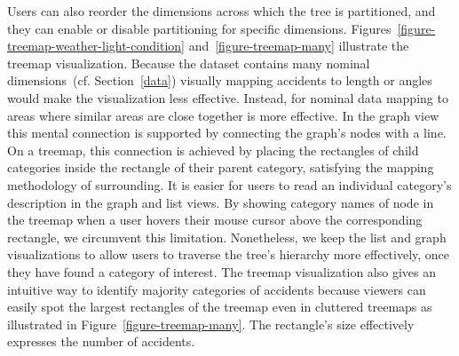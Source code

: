 Users can also reorder the dimensions across which the tree is partitioned, and they can enable or disable partitioning for specific dimensions.
Figures~\ref{figure-treemap-weather-light-condition} and~\ref{figure-treemap-many} illustrate the treemap visualization.
Because the dataset contains many nominal dimensions~(cf. Section~\ref{data}) visually mapping accidents to length or angles would make the visualization less effective. Instead, for nominal data mapping to areas where similar areas are close together is more effective.
In the graph view this mental connection is supported by connecting the graph's nodes with a line. On a treemap, this connection is achieved by placing the rectangles of child categories inside the rectangle of their parent category, satisfying the mapping methodology of surrounding.
It is easier for users to read an individual category's description in the graph and list views. By showing category names of node in the treemap when a user hovers their mouse cursor above the corresponding rectangle, we circumvent this limitation.
Nonetheless, we keep the list and graph visualizations to allow users to traverse the tree's hierarchy more effectively, once they have found a category of interest.
The treemap visualization also gives an intuitive way to identify majority categories of accidents because viewers can easily spot the largest rectangles of the treemap even in cluttered treemaps as illustrated in Figure~\ref{figure-treemap-many}. The rectangle's size effectively expresses the number of accidents.

